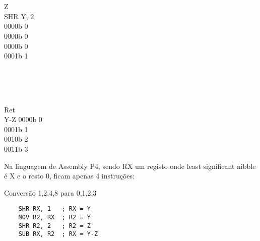 \documentclass{article}
\begin{document}
\begin{center}
\begin{minipage}{0.5cm}
\begin{center}
            \textrightarrow \\
            \textrightarrow \\
            \textrightarrow
        \end{center}
    \end{minipage}
    \begin{minipage}{1.5cm}
        \begin{center}
            Z \\
            SHR Y, 2 \\
            0000b 0 \\
            0000b 0 \\
            0000b 0 \\
            0001b 1
        \end{center}
    \end{minipage}
    \begin{minipage}{0.5cm}
        \begin{center}
            \vspace{1.1cm}
            \textrightarrow \\
            \textrightarrow \\
            \textrightarrow \\
            \textrightarrow
        \end{center}
    \end{minipage}
    \begin{minipage}{1.5cm}
        \begin{center}
            Ret \\
            Y-Z
            0000b 0 \\
            0001b 1 \\
            0010b 2 \\
            0011b 3
        \end{center}
    \end{minipage}
\end{center}

\bigbreak

Na linguagem de Assembly P4, sendo RX um registo onde least significant nibble é X e o resto 0, ficam apenas 4 instruções:

\bigbreak

\begin{code}{Conversão 1,2,4,8 para 0,1,2,3}{}
    \begin{verbatim}
    SHR RX, 1   ; RX = Y
    MOV R2, RX  ; R2 = Y
    SHR R2, 2   ; R2 = Z
    SUB RX, R2  ; RX = Y-Z
    \end{verbatim}
\end{code}

\newpage

\end{document}
